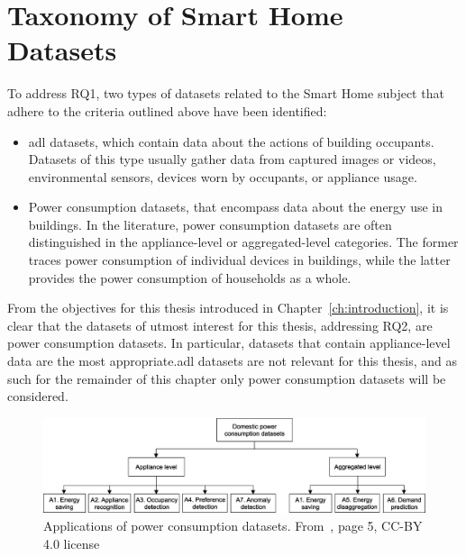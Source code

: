 \newpage

\section{Taxonomy of Smart Home Datasets}

To address RQ1, two types of datasets related to the Smart Home subject that adhere to the criteria outlined above have been identified:
\begin{itemize}
    \item \acrfull{adl} datasets, which contain data about the actions of building occupants. Datasets of this type usually gather data from captured images or videos, environmental sensors, devices worn by occupants, or appliance usage.
    \item Power consumption datasets, that encompass data about the energy use in buildings. In the literature, power consumption datasets are often distinguished in the appliance-level or aggregated-level categories. The former traces power consumption of individual devices in buildings, while the latter provides the power consumption of households as a whole.
\end{itemize}
From the objectives for this thesis introduced in Chapter~\ref{ch:introduction}, it is clear that the datasets of utmost interest for this thesis, addressing RQ2, are power consumption datasets. In particular, datasets that contain appliance-level data are the most appropriate.\@ \acrshort{adl} datasets are not relevant for this thesis, and as such for the remainder of this chapter only power consumption datasets will be considered.

\begin{figure}[h]
    \centering
    \includegraphics[width=.9\textwidth]{images/taxonomy_power_consumption.jpg}
    \caption[Applications of power consumption datasets]{Applications of power consumption datasets. From~\textcite{himeurBuildingPowerConsumption2020}, page 5, CC-BY 4.0 license}%
    \label{fig:applications_power_consumption_datasets}
\end{figure}

